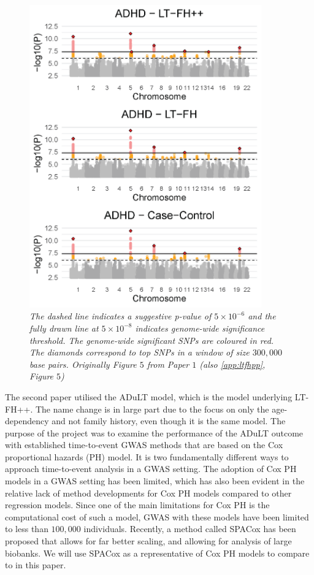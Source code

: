 \begin{figure}
	\includegraphics[width=10cm]{results/manhattanPlot_ADHD.png}
	\caption[Manhattan plots for LT-FH++, LT-FH, and case-control GWAS of ADHD in the iPSYCH data]{
		\sl The dashed line indicates a suggestive p-value of $ 5\times 10^{-6} $ and the fully drawn line at $ 5\times 10^{-8} $ indicates genome-wide significance threshold. The genome-wide significant SNPs are coloured in red. The diamonds correspond to top SNPs in a window of size $ 300,000 $ base pairs. Originally Figure $ 5 $ from Paper $ 1 $\cite{pedersen2022accounting} (also \cref{app:ltfhpp}, Figure $ 5 $)}	
	\label{fig:LTFH++_manhattanADHD}
\end{figure}

The second paper utilised the ADuLT model, which is the model underlying LT-FH++. The name change is in large part due to the focus on only the age-dependency and not family history, even though it is the same model. The purpose of the project was to examine the performance of the ADuLT outcome with established time-to-event GWAS methods that are based on the Cox proportional hazards (PH) model. It is two fundamentally different ways to approach time-to-event analysis in a GWAS setting. The adoption of Cox PH models in a GWAS setting has been limited, which has also been evident in the relative lack of method developments for Cox PH models compared to other regression models. Since one of the main limitations for Cox PH is the computational cost of such a model, GWAS with these models have been limited to less than $ 100,000 $ individuals. Recently, a method called SPACox \cite{bi2020fast} has been proposed that allows for far better scaling, and allowing for analysis of large biobanks. We will use SPACox as a representative of Cox PH models to compare to in this paper.
\newpage
